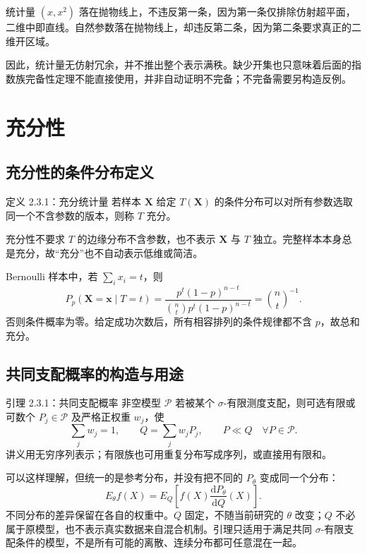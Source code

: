\begin{notebox}
统计量 $(x,x^2)$ 落在抛物线上，不违反第一条，因为第一条仅排除仿射超平面，二维中即直线。自然参数落在抛物线上，却违反第二条，因为第二条要求真正的二维开区域。

因此，统计量无仿射冗余，并不推出整个表示满秩。缺少开集也只意味着后面的指数族完备性定理不能直接使用，并非自动证明不完备；不完备需要另构造反例。
\end{notebox}

\section{充分性}

\subsection{充分性的条件分布定义}
\begin{definitionbox}{定义 2.3.1：充分统计量}
若样本 $\mathbf X$ 给定 $T(\mathbf X)$ 的条件分布可以对所有参数选取同一个不含参数的版本，则称 $T$ 充分。
\end{definitionbox}

充分性不要求 $T$ 的边缘分布不含参数，也不表示 $\mathbf X$ 与 $T$ 独立。完整样本本身总是充分，故“充分”也不自动表示低维或简洁。

Bernoulli 样本中，若 $\sum_i x_i=t$，则
\[
 P_p(\mathbf X=\mathbf x\mid T=t)
 =\frac{p^t(1-p)^{n-t}}{\binom nt p^t(1-p)^{n-t}}
 =\binom nt^{-1}.
\]
否则条件概率为零。给定成功次数后，所有相容排列的条件规律都不含 $p$，故总和充分。

\subsection{共同支配概率的构造与用途}
\begin{definitionbox}{引理 2.3.1：共同支配概率}
非空模型 $\mathcal P$ 若被某个 $\sigma$-有限测度支配，则可选有限或可数个 $P_j\in\mathcal P$ 及严格正权重 $w_j$，使
\[
 \sum_jw_j=1,\qquad Q=\sum_jw_jP_j,\qquad P\ll Q\quad\forall P\in\mathcal P.
\]
讲义用无穷序列表示；有限族也可用重复分布写成序列，或直接用有限和。
\end{definitionbox}

\begin{notebox}[追问：是不是统一在一个概率分布下研究？]
可以这样理解，但统一的是参考分布，并没有把不同的 $P_\theta$ 变成同一个分布：
\[
 E_\theta f(X)=E_Q\left[f(X)\frac{\mathrm dP_\theta}{\mathrm dQ}(X)\right].
\]
不同分布的差异保留在各自的权重中。$Q$ 固定，不随当前研究的 $\theta$ 改变；$Q$ 不必属于原模型，也不表示真实数据来自混合机制。引理只适用于满足共同 $\sigma$-有限支配条件的模型，不是所有可能的离散、连续分布都可任意混在一起。
\end{notebox}

